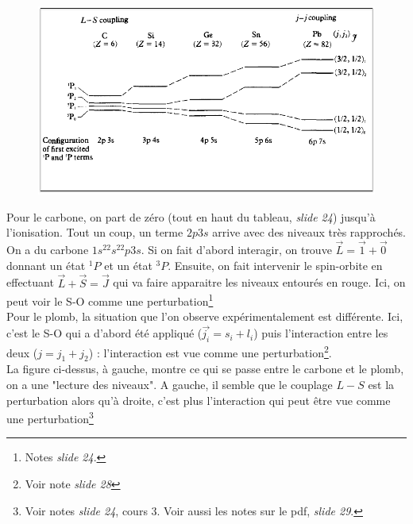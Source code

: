 	\begin{figure}
	\vspace{-5mm}
	\includegraphics[scale=0.4]{ch1/image5}
	\end{figure}
Pour le carbone, on part de zéro (tout en haut du tableau, \textit{slide 24}) jusqu'à 
l'ionisation. Tout un coup, un terme $2p3s$ arrive avec des niveaux très rapprochés. On a du
carbone $1s^22s^22p3s$. Si on fait d'abord interagir, on trouve $\vec{L}=\vec1+\vec0$ donnant
un état $^1P$ et un état $^3P$. Ensuite, on fait intervenir le spin-orbite en effectuant
$\vec{L}+\vec S=\vec J$ qui va faire apparaitre les niveaux entourés en rouge. Ici, on peut voir
le S-O comme une perturbation\footnote{Notes \textit{slide 24}.}\\

Pour le plomb, la situation que l'on observe expérimentalement est différente. Ici, c'est le 
S-O qui a d'abord été appliqué ($\vec{j_i}=s_i+l_i$) puis l'interaction entre les deux
($j=j_1+j_2$) : l'interaction est vue comme une perturbation\footnote{Voir note \textit{slide 28}}.\\

La figure ci-dessus, à gauche, montre ce qui se passe entre le carbone et le plomb, on a une
"lecture des niveaux". A gauche, il semble que le couplage $L-S$ est la perturbation alors qu'à
droite, c'est plus l'interaction qui peut être vue comme une perturbation\footnote{Voir notes
\textit{slide 24}, cours 3. Voir aussi les notes sur le pdf, \textit{slide 29}.}


